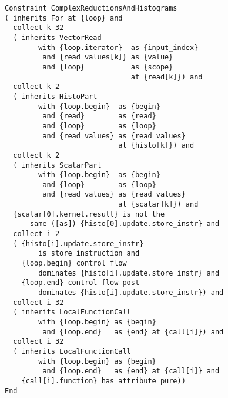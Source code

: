 \begin{figure}[h]
\begin{lstlisting}[language=IDL,basicstyle=\linespread{0.8}\small\ttfamily,
                   captionpos=t,caption=
   {Constraint specification of Complex Reduction and Histogram Computations in
    IDL
    \parfillskip=0pt}]
Constraint ComplexReductionsAndHistograms
( inherits For at {loop} and
  collect k 32
  ( inherits VectorRead
        with {loop.iterator}  as {input_index}
         and {read_values[k]} as {value}
         and {loop}           as {scope}
                              at {read[k]}) and
  collect k 2
  ( inherits HistoPart
        with {loop.begin}  as {begin}
         and {read}        as {read}
         and {loop}        as {loop}
         and {read_values} as {read_values}
                           at {histo[k]}) and
  collect k 2
  ( inherits ScalarPart
        with {loop.begin}  as {begin}
         and {loop}        as {loop}
         and {read_values} as {read_values}
                           at {scalar[k]}) and
  {scalar[0].kernel.result} is not the
      same ([as]) {histo[0].update.store_instr} and
  collect i 2
  ( {histo[i].update.store_instr}
        is store instruction and
    {loop.begin} control flow
        dominates {histo[i].update.store_instr} and
    {loop.end} control flow post
        dominates {histo[i].update.store_instr}) and
  collect i 32
  ( inherits LocalFunctionCall
        with {loop.begin} as {begin}
         and {loop.end}   as {end} at {call[i]}) and
  collect i 32
  ( inherits LocalFunctionCall
        with {loop.begin} as {begin}
         and {loop.end}   as {end} at {call[i]} and
    {call[i].function} has attribute pure))
End
\end{lstlisting}
\end{figure}
